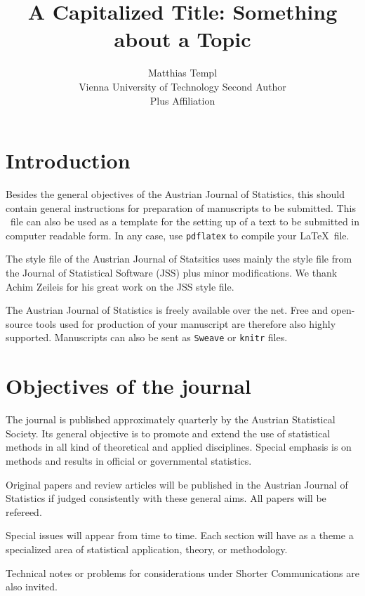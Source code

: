 \documentclass[article]{ajs}
\author{Matthias Templ\\ Vienna University of Technology \And 
        Second Author\\Plus Affiliation}
\title{A Capitalized Title: Something about a Topic}
\begin{document}


\section{Introduction}

Besides the general objectives of the Austrian Journal of
Statistics, this should contain general instructions for
preparation of manuscripts to be submitted. This \LaTeXe\ file can
also be used as a template for the setting up of a text to be
submitted in computer readable form. In any case, use \texttt{pdflatex} to compile your \LaTeX \ file.

The style file of the Austrian Journal of Statsitics uses mainly the style file from the Journal of Statistical Software (JSS) plus minor modifications. We thank Achim Zeileis for his great work on the JSS style file.


The Austrian Journal of Statistics is freely available over the net. Free and open-source tools used for production of your manuscript are therefore also highly supported. Manuscripts can also be sent as \texttt{Sweave} \citep[see, e.g.,][]{leisch02} or \texttt{knitr} \citep{yihui13} files.



\section{Objectives of the journal}

The journal is published approximately quarterly by the Austrian
Statistical Society. Its general objective is to promote and
extend the use of statistical methods in all kind of theoretical
and applied disciplines. Special emphasis is on methods and
results in official or governmental statistics.

Original papers and review articles will be published in the
Austrian Journal of Statistics if judged consistently with these
general aims. All papers will be refereed.

Special issues will appear from time to time. Each
section will have as a theme a specialized area of statistical
application, theory, or methodology.

Technical notes or problems for considerations under Shorter
Communications are also invited.
\end{document}
